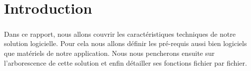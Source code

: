 \chapter*{Introduction}

\paragraph{}
    Dans ce rapport, nous allons couvrir les caractéristiques techniques de
    notre solution logicielle.
    Pour cela nous allons définir les pré-requis aussi bien logiciels que
    matériels de notre application.
    Nous nous pencherons ensuite sur l'arborescence de cette solution et enfin
    détailler ses fonctions fichier par fichier.